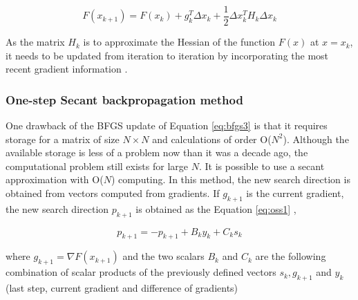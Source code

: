 \begin{equation}
\label{eq:bfgs3}
F(x_{k+1}) = F(x_{k})+ g^T_k\Delta x_k + \frac{1}{2}\Delta x^T_k H_k \Delta x_k
\end{equation}

As the matrix $H_k$ is to approximate the Hessian of the function $F(x)$ at $x = x_k$, it needs to be updated from iteration to iteration by incorporating the most recent gradient information \cite{saini2002artificial}.

\subsubsection{One-step Secant backpropagation method}

One drawback of the BFGS update of Equation \ref{eq:bfgs3} is that it requires storage for a matrix of size $N \times N$ and calculations of order O($N^ 2$). Although the available storage is less of a problem now than it was a decade ago, the computational problem still exists for large $N$. It is possible to use a secant approximation with O($N$) computing. In this method, the new search direction is obtained from vectors computed from gradients. If $g_{k+1}$ is the current gradient, the new search direction $p_{k+1}$ is obtained as the Equation \ref{eq:oss1} \cite{saini2002artificial},

\begin{equation}
\label{eq:oss1}
p_{k+1} = - p_{k+1} + B_k y_k +C_k s_k
\end{equation}

where $g_{k+1} = \nabla F(x_{k+1})$ and the two scalars $B_k$ and $C_k$ are the following combination of scalar products of the previously defined vectors $s_k, g_{k+1}$ and $y_k$ (last step, current gradient and difference of gradients)

